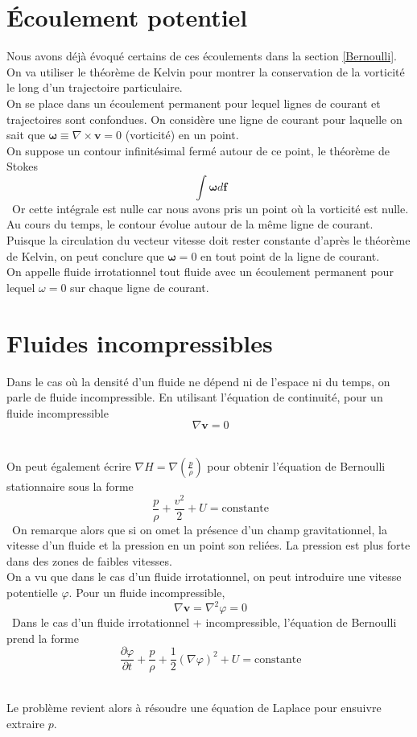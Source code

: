 \documentclass[10pt,a4paper]{book}
\begin{document}
\section{Écoulement potentiel}

Nous avons déjà évoqué certains de ces écoulements dans la section \ref{Bernoulli}. \\
On va utiliser le théorème de Kelvin pour montrer la conservation de la vorticité le long d'un trajectoire particulaire.\\

On se place dans un écoulement permanent pour lequel lignes de courant et trajectoires sont confondues. On considère une ligne de courant pour laquelle on sait que $\mathbf{\omega} \equiv \nabla \times \mathbf{v}=0$ (vorticité) en un point.\\
On suppose un contour infinitésimal fermé autour de ce point, le théorème de Stokes \[\ \int \mathbf{\omega} d\mathbf{f} \]\
Or cette intégrale est nulle car nous avons pris un point où la vorticité est nulle.\\

Au cours du temps, le contour évolue autour de la même ligne de courant. Puisque la circulation du vecteur vitesse doit rester constante d'après le théorème de Kelvin, on peut conclure que $\mathbf{\omega}=0$ en tout point de la ligne de courant.\\

On appelle fluide irrotationnel tout fluide avec un écoulement permanent pour lequel $\omega=0$ sur chaque ligne de courant.

\section{Fluides incompressibles}

Dans le cas où la densité d'un fluide ne dépend ni de l'espace ni du temps, on parle de fluide incompressible. En utilisant l'équation de continuité, pour un fluide incompressible \[\ \nabla \mathbf{v}=0 \]\

On peut également écrire $\nabla H =\nabla(\frac{p}{\rho})$ pour obtenir l'équation de Bernoulli stationnaire sous la forme \[\ \frac{p}{\rho}+\frac{v^2}{2}+U=\textrm{constante}\]\
On remarque alors que si on omet la présence d'un champ gravitationnel, la vitesse d'un fluide et la pression en un point son reliées. La pression est plus forte dans des zones de faibles vitesses.\\

On a vu que dans le cas d'un fluide irrotationnel, on peut introduire une vitesse potentielle $\varphi$. Pour un fluide incompressible, \[\ \nabla \mathbf{v}=\nabla ^2 \varphi=0\]\
Dans le cas d'un fluide irrotationnel + incompressible, l'équation de Bernoulli prend la forme 
\[\ \frac{\partial \varphi}{\partial t}+\frac{p}{\rho}+\frac{1}{2}(\nabla \varphi)^2+U=\textrm{constante} \]\

Le problème revient alors à résoudre une équation de Laplace pour ensuivre extraire $p$.
\end{document}
